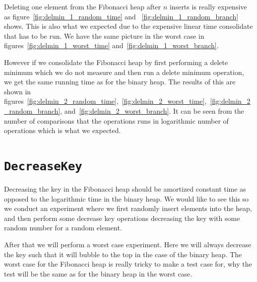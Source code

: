 \documentclass[a4paper,oneside,article,11pt]{memoir}
\begin{document}
Deleting one element from the Fibonacci heap after $n$ inserts is really expensive as figure~\ref{fig:delmin_1_random_time} and ~\ref{fig:delmin_1_random_branch} shows. This is also what we expected due to the expensive linear time consolidate that has to be run. We have the same picture in the worst case in figures~\ref{fig:delmin_1_worst_time} and~\ref{fig:delmin_1_worst_branch}.

However if we consolidate the Fibonacci heap by first performing a delete minimum which we do not measure and then run a delete minimum operation, we get the same running time as for the binary heap. The results of this are shown in figures~\ref{fig:delmin_2_random_time},~\ref{fig:delmin_2_worst_time},~\ref{fig:delmin_2_random_branch}, and~\ref{fig:delmin_2_worst_branch}. It can be seen from the number of comparisons that the operations runs in logarithmic number of operations which is what we expected.

\section{\texttt{DecreaseKey}}
Decreasing the key in the Fibonacci heap should be amortized constant time as opposed to the logarithmic time in the binary heap. We would like to see this so we conduct an experiment where we first randomly insert elements into the heap, and then perform some decrease key operations decreasing the key with some random number for a random element.

After that we will perform a worst case experiment. Here we will always decrease the key such that it will bubble to the top in the case of the binary heap. The worst case for the Fibonacci heap is really tricky to make a test case for, why the test will be the same as for the binary heap in the worst case.
\end{document}
